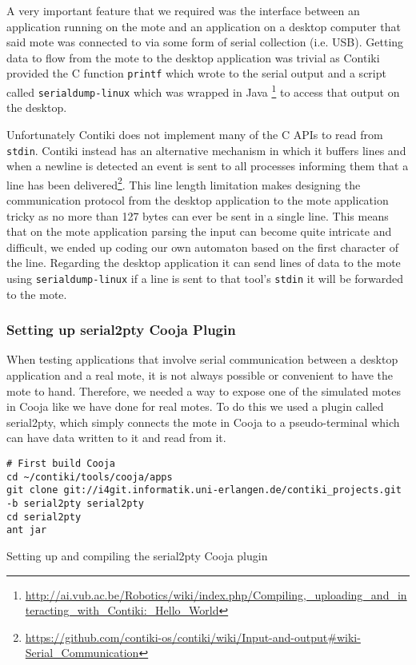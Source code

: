 A very important feature that we required was the interface between an application running on the mote and an application on a desktop computer that said mote was connected to via some form of serial collection (i.e. USB). Getting data to flow from the mote to the desktop application was trivial as Contiki provided the C function \verb|printf| which wrote to the serial output and a script called \verb|serialdump-linux| which was wrapped in Java \footnote{\url{http://ai.vub.ac.be/Robotics/wiki/index.php/Compiling,\_uploading\_and\_interacting\_with\_Contiki:\_Hello_World}} to access that output on the desktop.

Unfortunately Contiki does not implement many of the C APIs to read from \verb|stdin|. Contiki instead has an alternative mechanism in which it buffers lines and when a newline is detected an event is sent to all processes informing them that a line has been delivered\footnote{\url{https://github.com/contiki-os/contiki/wiki/Input-and-output\#wiki-Serial\_Communication}}. This line length limitation makes designing the communication protocol from the desktop application to the mote application tricky as no more than 127 bytes can ever be sent in a single line. This means that on the mote application parsing the input can become quite intricate and difficult, we ended up coding our own automaton \cite{sipser2006introduction} based on the first character of the line. Regarding the desktop application it can send lines of data to the mote using \verb|serialdump-linux| if a line is sent to that tool's \verb|stdin| it will be forwarded to the mote.


\subsubsection{Setting up serial2pty Cooja Plugin}

When testing applications that involve serial communication between a desktop application and a real mote, it is not always possible or convenient to have the mote to hand. Therefore, we needed a way to expose one of the simulated motes in Cooja like we have done for real motes. To do this we used a plugin called serial2pty, which simply connects the mote in Cooja to a pseudo-terminal which can have data written to it and read from it.

\begin{listing}[H]
\begin{verbatim}
# First build Cooja
cd ~/contiki/tools/cooja/apps
git clone git://i4git.informatik.uni-erlangen.de/contiki_projects.git -b serial2pty serial2pty
cd serial2pty
ant jar
\end{verbatim}
\caption{Setting up and compiling the serial2pty Cooja plugin}
\label{lst:setup-serial2pty}
\end{listing}


